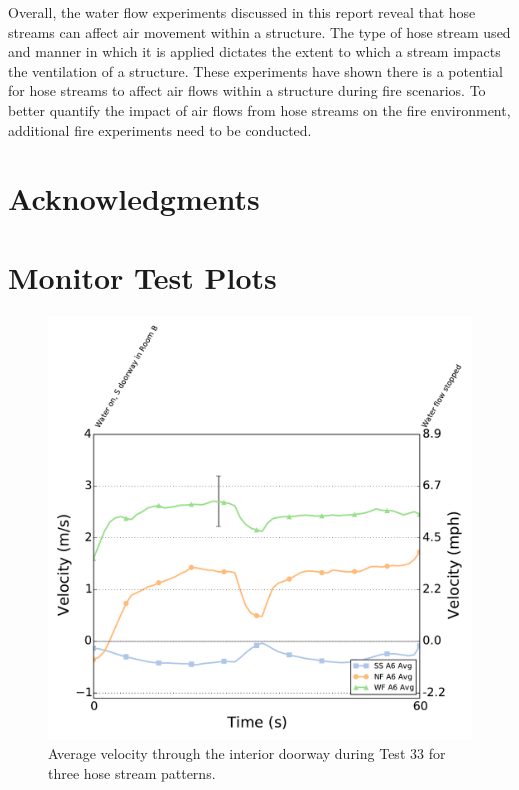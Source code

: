 \documentclass[12pt,oneside]{book}
\begin{document}
Overall, the water flow experiments discussed in this report reveal that hose streams can affect air movement within a structure. The type of hose stream used and manner in which it is applied dictates the extent to which a stream impacts the ventilation of a structure. These experiments have shown there is a potential for hose streams to affect air flows within a structure during fire scenarios. To better quantify the impact of air flows from hose streams on the fire environment, additional fire experiments need to be conducted.

\chapter{Acknowledgments}
\label{chap:acknowledgments}



\appendix
\chapter{Monitor Test Plots}
\label{chap:monitor_plots}

\begin{figure}[!ht]
	\includegraphics[width=0.86\columnwidth]{../Figures/Plots/HOSE_IXXAXX_BDP_A6_stream_avgs}
	\caption{Average velocity through the interior doorway during Test 33 for three hose stream patterns.}
	\label{fig:Test_33_BDP_A6_Avg_All}
\end{figure}
\FloatBarrier
\end{document}
